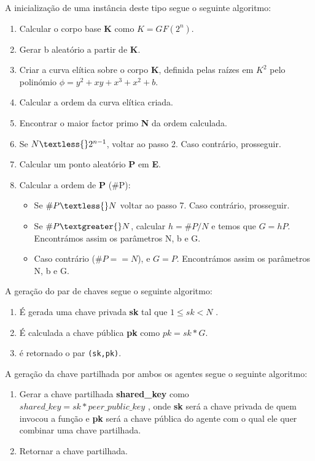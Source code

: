 \documentclass[11pt]{article}
\providecommand{\tightlist}{%
      \setlength{\itemsep}{0pt}\setlength{\parskip}{0pt}}
\begin{document}
A inicialização de uma instância deste tipo segue o seguinte algoritmo:

\begin{enumerate}
\def\labelenumi{\arabic{enumi}.}
\tightlist
\item
  Calcular o corpo base \textbf{K} como $K = GF(2^{n}) $.
\item
  Gerar b aleatório a partir de \textbf{K}.
\item
  Criar a curva elítica sobre o corpo \textbf{K}, definida pelas raízes
  em \(K^2\) pelo polinómio $ \phi = y^{2} + xy + x^{3} + x^{2} +
  b$.
\item
  Calcular a ordem da curva elítica criada.
\item
  Encontrar o maior factor primo \textbf{N} da ordem calculada.
\item
  Se $ N \textless{} 2^{n-1} $, voltar ao passo 2. Caso
  contrário, prosseguir.
\item
  Calcular um ponto aleatório \textbf{P} em \textbf{E}.
\item
  Calcular a ordem de \textbf{P} (\#P):

  \begin{itemize}
  \tightlist
  \item
    Se $ \#P \textless{} N $ voltar ao passo 7. Caso contrário,
    prosseguir.
  \item
    Se $ \#P \textgreater{} N $, calcular $ h = \#P/N $ e temos que
    $ G = hP $. Encontrámos assim os parâmetros N, b e G.
  \item
    Caso contrário ($ \#P == N $), e $ G = P $. Encontrámos assim os
    parâmetros N, b e G.
  \end{itemize}
\end{enumerate}

A geração do par de chaves segue o seguinte algoritmo:

\begin{enumerate}
\def\labelenumi{\arabic{enumi}.}
\tightlist
\item
  É gerada uma chave privada \textbf{sk} tal que $ 1 \leqslant sk
  < N $ .
\item
  É calculada a chave pública \textbf{pk} como $ pk = sk * G $.
\item
  é retornado o par \texttt{(sk,pk)}.
\end{enumerate}

A geração da chave partilhada por ambos os agentes segue o seguinte
algoritmo:

\begin{enumerate}
\def\labelenumi{\arabic{enumi}.}
\tightlist
\item
  Gerar a chave partilhada \textbf{shared\_key} como $ shared\_key = sk
  * peer\_public\_key $ , onde \textbf{sk} será a chave privada de
  quem invocou a função e \textbf{pk} será a chave pública do agente com
  o qual ele quer combinar uma chave partilhada.
\item
  Retornar a chave partilhada.
\end{enumerate}
\end{document}
